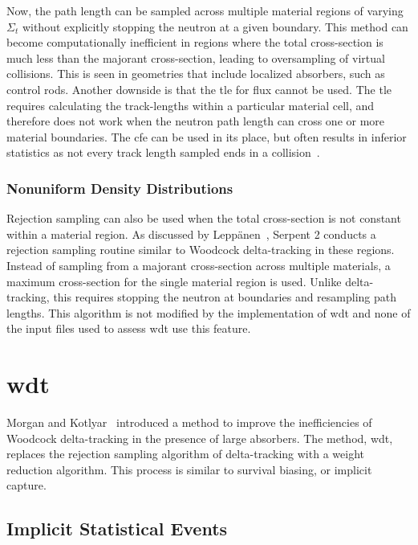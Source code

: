 Now, the path length can be sampled across multiple material regions
of varying $\Sigma_t$ without explicitly stopping the neutron at a
given boundary. This method can become computationally inefficient in
regions where the total cross-section is much less than the majorant
cross-section, leading to oversampling of virtual collisions. This is
seen in geometries that include localized absorbers, such as control
rods. Another downside is that the \gls{tle} for
flux cannot be used. The \gls{tle} requires calculating the track-lengths
within a particular material cell, and therefore does not work when
the neutron path length can cross one or more material
boundaries. The \gls{cfe} can be used in its
place, but often results in inferior statistics as not every track
length sampled ends in a collision~\cite{leppanen2013}.

\subsubsection{Nonuniform Density Distributions}
\label{sec:nonuniform}

Rejection sampling can also be used when the total cross-section is
not constant within a material region. As discussed by
Lepp\"{a}nen~\cite{leppanen2013}, Serpent 2 conducts a rejection
sampling routine similar to Woodcock delta-tracking in these
regions. Instead of sampling from a majorant cross-section across
multiple materials, a maximum cross-section for the single material
region is used. Unlike delta-tracking, this requires stopping the
neutron at boundaries and resampling path lengths. This algorithm is
not modified by the implementation of \gls{wdt} and none of the input
files used to assess \gls{wdt} use this feature.

\section{\Acrlong{wdt}}
\label{sec:wdt}

Morgan and Kotlyar~\cite{morgan2015} introduced a method to improve the
inefficiencies of Woodcock delta-tracking in the presence of large
absorbers. The method, \gls{wdt}, replaces the
rejection sampling algorithm of delta-tracking with a weight reduction
algorithm. This process is similar to survival biasing, or implicit capture.

\subsection{Implicit Statistical Events}
\label{sec:implicit}

